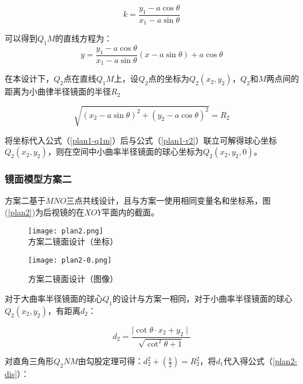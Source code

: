 \documentclass[bwprint]{cumcmthesis}
\begin{document}
$$k = \frac{y_1 - a \mathop{cos} \theta}{x_1 - a \mathop{sin} \theta}$$
 
\par 可以得到$Q_1M$的直线方程为：
\begin{equation}
\label{plan1-q1m}
	y = \frac{y_1 - a \mathop{cos} \theta}{x_1 - a \mathop{sin} \theta} (x - a \mathop{sin} \theta ) + a \mathop{cos} \theta
\end{equation}

在本设计下，$Q_2$点在直线$Q_1M$上，设$Q_2$点的坐标为$Q_2(x_2, y_2)$，$Q_2$和$M$两点间的距离为小曲律半径镜面的半径$R_2$

\begin{equation}
\label{plan1-r2}
	\sqrt{(x_2 - a \mathop{sin}\theta )^2 + (y_2 - a \mathop{cos}\theta )^2} = R_2
\end{equation}
\par 将坐标代入公式（\ref{plan1-q1m}）后与公式（\ref{plan1-r2}）联立可解得球心坐标$Q_2(x_2,y_2)$，则在空间中小曲率半径镜面的球心坐标为$Q_2(x_2,y_2,0)$。


\subsubsection{镜面模型方案二}

\par 方案二基于$MNO$三点共线设计，且与方案一使用相同变量名和坐标系，图(\ref{plan2})为后视镜的在$XOY$平面内的截面。


\begin{figure}[!htbp]  
\begin{minipage}[t]{0.5\textwidth}
\centering  
\texttt{[image: plan2.png]} \\
\caption{方案二镜面设计（坐标）} \label{plan2}
\end{minipage}
\hspace{1ex}
\begin{minipage}[t]{0.5\textwidth}  
\centering  
\texttt{[image: plan2-0.png]}\\
\caption{方案二镜面设计（图像）}  \label{plan2-0}
\end{minipage}  
\end{figure} 

\par 对于大曲率半径镜面的球心$Q_1$的设计与方案一相同，对于小曲率半径镜面的球心$Q_2(x_2,y_2)$，有距离$d_2$：

\begin{equation}
	d_2 = \frac{\mid \mathop{cot}\theta \cdot x_2 + y_2 \mid}{\sqrt{\mathop{cot}^{2} \theta + 1}} 
\end{equation}
\par 对直角三角形$Q_2NM$由勾股定理可得：$d_2^2 + \left( \frac{b}{2} \right) = R_2^2$，将$d_1$代入得公式（\ref{plan2-dis}）：
\end{document}
